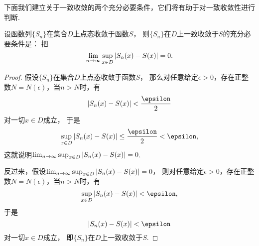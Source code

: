 下面我们建立关于一致收敛的两个充分必要条件，它们将有助于对一致收敛性进行判断.
\begin{theorem}
设函数列\(\{S_n\}\)在集合\(D\)上点态收敛于函数\(S\)，
则\(\{S_n\}\)在\(D\)上一致收敛于\(S\)的充分必要条件是：
把\[
	\lim_{n\to\infty} \sup_{x \in D} \abs{S_n(x) - S(x)} = 0.
\]
\begin{proof}
假设\(\{S_n\}\)在集合\(D\)上点态收敛于函数\(S\)，
那么对任意给定\(\epsilon>0\)，存在正整数\(N = N(\epsilon)\)，当\(n>N\)时，有\[
	\abs{S_n(x) - S(x)} < \frac\epsilon2
\]对一切\(x \in D\)成立，
于是\[
	\sup_{x \in D} \abs{S_n(x) - S(x)} \leq \frac\epsilon2 < \epsilon,
\]
这就说明\(\lim_{n\to\infty} \sup_{x \in D} \abs{S_n(x) - S(x)} = 0\).

反过来，假设\(\lim_{n\to\infty} \sup_{x \in D} \abs{S_n(x) - S(x)} = 0\)，
则对任意给定\(\epsilon>0\)，存在正整数\(N = N(\epsilon)\)，当\(n>N\)时，有\[
	\sup_{x \in D} \abs{S_n(x) - S(x)} < \epsilon,
\]
于是\[
	\abs{S_n(x) - S(x)} < \epsilon
\]对一切\(x \in D\)成立，
即\(\{S_n\}\)在\(D\)上一致收敛于\(S\).
\end{proof}
\end{theorem}

